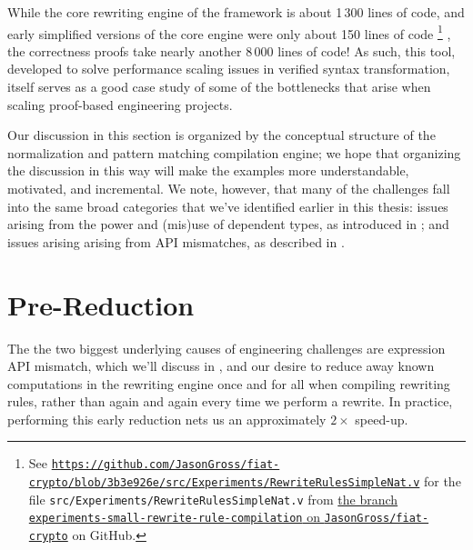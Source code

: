 While the core rewriting engine of the framework is about 1\,300 lines of code, and early simplified versions of the core engine were only about 150 lines of code%
\footnote{%
See \href{https://web.archive.org/web/20200716002534/https://github.com/JasonGross/fiat-crypto/blob/3b3e926e4186caa1a4003c81c65dad0a1c04b43d/src/Experiments/RewriteRulesSimpleNat.v}{\texttt{https://github.com/JasonGross/fiat-crypto/blob/3b3e926e/src/Experiments/RewriteRulesSimpleNat.v}} for the file \texttt{src/Experiments/RewriteRulesSimpleNat.v} from \href{https://github.com/JasonGross/fiat-crypto/tree/experiments-small-rewrite-rule-compilation}{the branch \texttt{experiments-small-rewrite-rule-compilation} on \texttt{JasonGross/fiat-crypto}} on GitHub.%
}%
, the correctness proofs take nearly another 8\,000 lines of code!
As such, this tool, developed to solve performance scaling issues in verified syntax transformation, itself serves as a good case study of some of the bottlenecks that arise when scaling proof-based engineering projects.

Our discussion in this section is organized by the conceptual structure of the normalization and pattern matching compilation engine;
we hope that organizing the discussion in this way will make the examples more understandable, motivated, and incremental.
We note, however, that many of the challenges fall into the same broad categories that we've identified earlier in this thesis:
issues arising from the power and (mis)use of dependent types, as introduced in ;
and issues arising arising from API mismatches, as described in .

\section{Pre-Reduction}\label{sec:rewriting-more:pre-reduction}
The the two biggest underlying causes of engineering challenges are expression API mismatch, which we'll discuss in , and our desire to reduce away known computations in the rewriting engine once and for all when compiling rewriting rules, rather than again and again every time we perform a rewrite.
In practice, performing this early reduction nets us an approximately $2\times$ speed-up.

